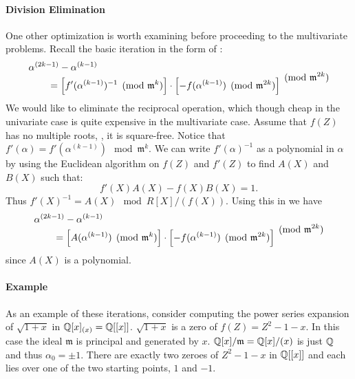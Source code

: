 \paragraph{Division Elimination}

One other optimization is worth examining before proceeding to the
multivariate problems.  Recall the basic iteration in the form of
:
\[
\begin{aligned}
\null & \alpha^{(2k-1)} - \alpha^{(k-1)} \\
\null & \qquad = 
\left[ f'(\alpha^{(k-1)})^{-1} \pmod{\mathfrak{m}^k}\right]
\cdot
\left[ - f(\alpha^{(k-1)}) \pmod{\mathfrak{m}^{2k}}\right]
\end{aligned}
\pmod{\mathfrak{m}^{2k}}
\]
We would like to eliminate the reciprocal operation, which though cheap in
the univariate case is quite expensive in the multivariate case.  Assume
that $f(Z)$ has no multiple roots, \ie, it is square-free.  Notice that
$f'(\alpha) = f'(\alpha^{(k-1)}) \mod{\mathfrak{m}^k}$.  We can write
$f'(\alpha)^{-1}$ as a polynomial in $\alpha$ by using the Euclidean
algorithm on $f(Z)$ and $f'(Z)$ to find $A(X)$ and $B(X)$ such that:
\[
f'(X) A(X) - f(X) B(X) = 1.
\]
Thus $f'(X)^{-1} = A(X) \mod{R[X]/(f(X))}$.  Using this in
 we have
\[
\begin{aligned}
\null & \alpha^{(2k-1)} - \alpha^{(k-1)} \\
\null & \qquad=  
\left[ A(\alpha^{(k-1)}) \pmod{\mathfrak{m}^k}\right] \cdot
\left[ - f(\alpha^{(k-1)}) \pmod{\mathfrak{m}^{2k}}\right] 
\end{aligned} 
\pmod{\mathfrak{m}^{2k}}
\]
since $A(X)$ is a polynomial.

\paragraph{Example}

As an example of these iterations, consider computing the power series
expansion of $\sqrt{1+x}$ in $\mathbb{Q}[x]_{(x)} = \mathbb{Q}[[x]]$.  $\sqrt{1+x}$ is
a zero of $f(Z) = Z^2 - 1 - x$.  In this case the ideal $\mathfrak{m}$
is principal and generated by $x$.  $\mathbb{Q}[x]/\mathfrak{m} = \mathbb{Q}[x]/(x)$
is just $\mathbb{Q}$ and thus $\alpha_0 = \pm1$.  There are exactly two zeroes
of $Z^2 -1 - x$ in $\mathbb{Q}[[x]]$ and each lies over one of the two
starting points, $1$ and $-1$.

